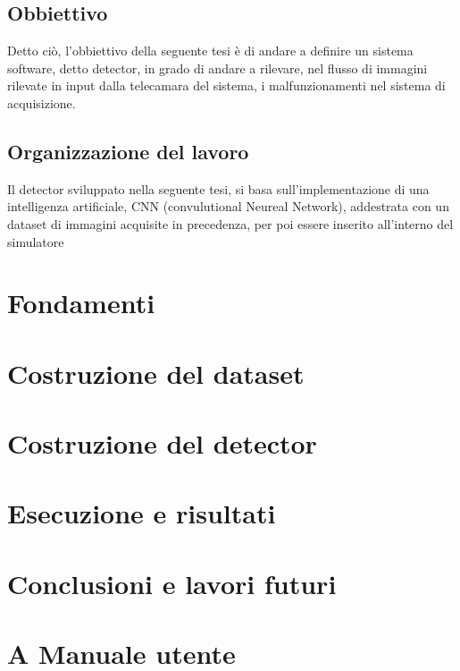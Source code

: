 \documentclass[14pt]{extarticle}
\begin{document}
\subsection{Obbiettivo}
Detto ciò, l'obbiettivo della seguente tesi è di andare a definire un sistema software, detto detector, in grado di andare a rilevare, nel flusso di immagini rilevate in input dalla telecamara del sistema, i malfunzionamenti nel sistema di acquisizione. 
\subsection{Organizzazione del lavoro}
Il detector sviluppato nella seguente tesi, si basa sull'implementazione di una intelligenza artificiale, CNN (convulutional Neureal Network), addestrata con un dataset di immagini acquisite in  precedenza, per poi essere inserito all'interno del simulatore
\section{Fondamenti}


\section{Costruzione del dataset}

\section{Costruzione del detector}

\section{Esecuzione e risultati}

\section{Conclusioni e lavori futuri}

\section{A Manuale utente}
\end{document}
